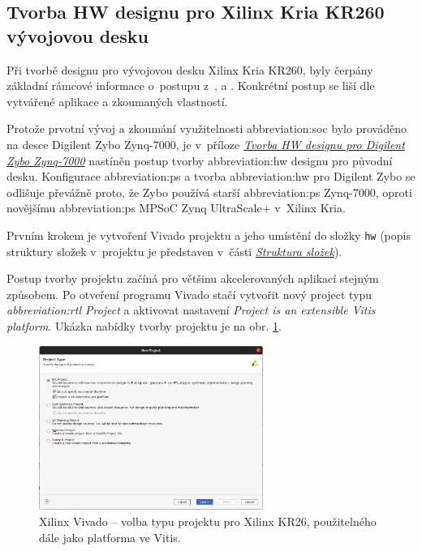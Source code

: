 \documentclass[a4paper, twoside, 11pt]{article}
\begin{document}
		
		\subsection{Tvorba HW designu pro Xilinx Kria KR260 vývojovou desku}\label{subsec:tvorba-hw-designu-pro-xilinx-kria-kr260}
				Při tvorbě designu pro vývojovou desku Xilinx Kria KR260, byly čerpány základní rámcové informace o~postupu z~\cite{hackster-getting-started-with-the-kria-kr260-in-petalinux}, \cite{hackster-add-peripherial-support-to-kria-kr260-vivado} a \cite{hackster-getting-started-with-the-kria-kr260-in-vivado}. Konkrétní postup se liší dle vytvářené aplikace a zkoumaných vlastností.\par
				Protože prvotní vývoj a zkoumání využitelnosti \gls{abbreviation:soc} bylo prováděno na desce Digilent Zybo Zynq-7000, je v~příloze \hyperref[sec:appendicies:-tvorba-hw-designu-pro-digilent-zybo-zynq-7000]{\textit{Tvorba HW designu pro Digilent Zybo Zynq-7000}} nastíněn postup tvorby \gls{abbreviation:hw} designu pro původní desku. Konfigurace \gls{abbreviation:ps} a tvorba \gls{abbreviation:hw} pro Digilent Zybo se odlišuje převážně proto, že Zybo používá starší \gls{abbreviation:ps} Zynq-7000, oproti novějšímu \gls{abbreviation:ps} MPSoC Zynq UltraScale+ v~Xilinx Kria.\par
				Prvním krokem je vytvoření Vivado projektu a jeho umístění do složky \texttt{hw} (popis struktury složek v~projektu je představen v~části \hyperref[sec:struktura-slozek]{\textit{Struktura složek}}).\par
				Postup tvorby projektu začíná pro většinu akcelerovaných aplikací stejným způsobem. Po otveření programu Vivado stačí vytvořit nový project typu \textit{\gls{abbreviation:rtl} Project} a aktivovat nastavení \textit{Project is an extensible Vitis platform}. Ukázka nabídky tvorby projektu je na obr. \ref{fig:kr26-xilix-vivado-flow-01}.


				\begin{figure}[htbp!]
					\centering
					\includegraphics[width=0.65\textwidth]{src/png/kr26-xilinx-vivado-flow/kr26-xilix-vivado-flow-01.jpg}
					\caption{Xilinx Vivado – volba typu projektu pro Xilinx KR26, použitelného dále jako platforma ve Vitis.}
					\label{fig:kr26-xilix-vivado-flow-01}
				\end{figure}
\end{document}
